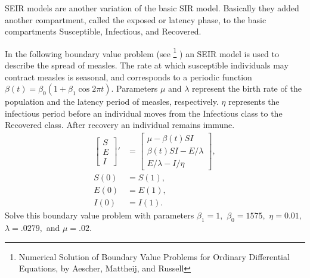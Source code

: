 \begin{problem}
SEIR models are another variation of the basic SIR model. Basically they added another compartment, called the exposed or latency phase, to the basic compartments Susceptible, Infectious, and Recovered. 

In the following boundary value problem (see \footnote{Numerical Solution of Boundary Value Problems for Ordinary Differential Equations, by Aescher, Mattheij, and Russell} ) an SEIR model is used to describe the spread of measles. The rate at which susceptible individuals may contract measles is seasonal, and corresponds to a periodic function $\beta(t) = \beta_0(1 + \beta_1 \cos{2\pi t})$. Parameters $\mu$ and $\lambda$ represent the birth rate of the population and the latency period of measles, respectively. $\eta$ represents the infectious period before an individual moves from the Infectious class to the Recovered class. After recovery an individual remains immune. 
\begin{align*}
\left[\begin{array}{c}S \\ E \\ I\end{array}\right]' &= \left[\begin{array}{c}\mu - \beta(t) S I \\\beta(t) SI - E/\lambda \\E/\lambda - I/\eta\end{array}\right],\\
S(0) &= S(1),\\
E(0) &= E(1),\\
I(0) &= I(1).
\end{align*}
Solve this boundary value problem with parameters  $\beta_1 = 1,$ $\beta_0 = 1575,$ $\eta = 0.01,$ $\lambda = .0279,$ and $\mu = .02.$ 
\label{sir_measles}
\end{problem}

